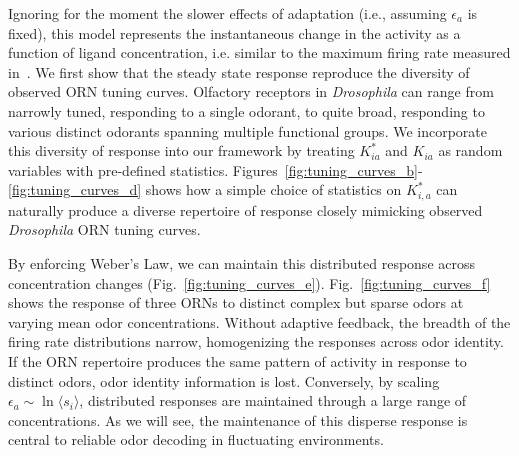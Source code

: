Ignoring for the moment the slower effects of adaptation (i.e., assuming $\epsilon_a$ is fixed), this model represents the instantaneous change in the activity as a function of ligand concentration, i.e. similar to the maximum firing rate measured in~\cite{hallem_carlson}. We first show that the steady state response reproduce the diversity of observed ORN tuning curves. Olfactory receptors in \textit{Drosophila} can range from narrowly tuned, responding to a single odorant, to quite broad, responding to various distinct odorants spanning multiple functional groups. We incorporate this diversity of response into our framework by treating $K^*_{ia}$ and $K_{ia}$ as random variables with pre-defined statistics. Figures~\ref{fig:tuning_curves_b}-\ref{fig:tuning_curves_d} shows how a simple choice of statistics on $K^*_{i, a}$ can naturally produce a diverse repertoire of response closely mimicking observed \textit{Drosophila} ORN tuning curves. %

By enforcing Weber's Law, we can maintain this distributed response across concentration changes (Fig.~\ref{fig:tuning_curves_e}). Fig.~\ref{fig:tuning_curves_f} shows the response of three ORNs to distinct complex but sparse odors at varying mean odor concentrations. Without adaptive feedback, the breadth of the firing rate distributions narrow, homogenizing the responses across odor identity. If the ORN repertoire produces the same pattern of activity in response to distinct odors, odor identity information is lost. Conversely, by scaling $\epsilon_a \sim \ln \langle s_i \rangle$, distributed responses are maintained through a large range of concentrations. As we will see, the maintenance of this disperse response is central to reliable odor decoding in fluctuating  environments. 






